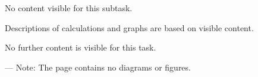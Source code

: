 No content visible for this subtask.  

Descriptions of calculations and graphs are based on visible content.

No further content is visible for this task.  

---  
Note: The page contains no diagrams or figures.